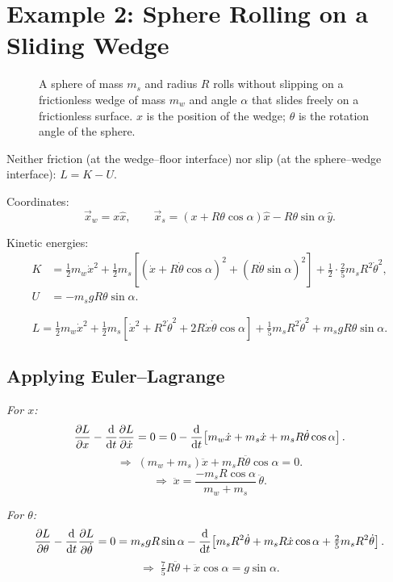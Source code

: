 \section{Example 2: Sphere Rolling on a Sliding Wedge}

\begin{figure}[H]
    \centering
    \caption{A sphere of mass $m_s$ and radius $R$ rolls without slipping on a
    frictionless wedge of mass $m_w$ and angle $\alpha$ that slides freely on a
    frictionless surface. $x$ is the position of the wedge; $\theta$ is the rotation
    angle of the sphere.}
\end{figure}

Neither friction (at the wedge--floor interface) nor slip (at the sphere--wedge
interface): $L = K - U$.

Coordinates:
\[
    \vec{x}_w = x\hat{x}, \qquad
    \vec{x}_s = (x + R\theta\cos\alpha)\hat{x} - R\theta\sin\alpha\,\hat{y}.
\]

Kinetic energies:
\begin{align*}
    K &= \tfrac{1}{2}m_w\dot{x}^2
       + \tfrac{1}{2}m_s\left[(\dot{x} + R\dot{\theta}\cos\alpha)^2
         + (R\dot{\theta}\sin\alpha)^2\right]
       + \tfrac{1}{2}\cdot\tfrac{2}{5}m_s R^2\dot{\theta}^2, \\
    U &= -m_s g R\theta\sin\alpha.
\end{align*}

\[
    L = \tfrac{1}{2}m_w\dot{x}^2
      + \tfrac{1}{2}m_s\!\left[\dot{x}^2 + R^2\dot{\theta}^2
        + 2R\dot{x}\dot{\theta}\cos\alpha\right]
      + \tfrac{1}{5}m_s R^2\dot{\theta}^2 + m_s g R\theta\sin\alpha.
\]

\subsection{Applying Euler--Lagrange}

\textit{For $x$:}
\[
    \frac{\partial L}{\partial x} - \dv{t}\frac{\partial L}{\partial \dot{x}}
    = 0 = 0 - \dv{t}\!\left[m_w\dot{x} + m_s\dot{x} + m_s R\dot{\theta}\cos\alpha\right].
\]
\[
    \Rightarrow\; (m_w + m_s)\ddot{x} + m_s R\ddot{\theta}\cos\alpha = 0. \tag{1}
\]
\[
    \Rightarrow\; \ddot{x} = \frac{-m_s R\cos\alpha}{m_w + m_s}\,\ddot{\theta}.
\]

\textit{For $\theta$:}
\[
    \frac{\partial L}{\partial \theta} - \dv{t}\frac{\partial L}{\partial \dot{\theta}}
    = 0
    = m_s g R\sin\alpha
    - \dv{t}\!\left[m_s R^2\dot{\theta} + m_s R\dot{x}\cos\alpha
        + \tfrac{2}{5}m_s R^2\dot{\theta}\right].
\]
\[
    \Rightarrow\; \tfrac{7}{5}R\ddot{\theta} + \ddot{x}\cos\alpha = g\sin\alpha. \tag{2}
\]

